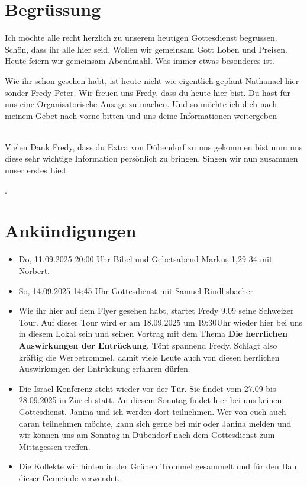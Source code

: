 \documentclass{../../inc/mybib}
\begin{document}
\section{Begrüssung}
Ich möchte alle recht herzlich zu unserem heutigen Gottesdienst begrüssen. Schön, dass ihr alle hier seid. Wollen wir gemeinsam Gott Loben und Preisen. Heute feiern wir gemeinsam Abendmahl. Was immer etwas besonderes ist. 
\begin{block}
Wie ihr schon gesehen habt, ist heute nicht wie eigentlich geplant Nathanael hier sonder Fredy Peter. Wir freuen uns Fredy, dass du heute hier bist. Du hast für uns eine Organisatorische Ansage zu machen. Und so möchte ich dich nach meinem Gebet nach vorne bitten und uns deine Informationen weitergeben
\end{block}

\beten{}
\\

Vielen Dank Fredy, dass du Extra von Dübendorf zu uns gekommen bist unm uns diese sehr wichtige Information persönlich zu bringen. Singen wir nun zusammen unser erstes Lied.

{}.

\section{Ankündigungen}
\begin{itemize}
    \item {} Do, 11.09.2025 20:00 Uhr Bibel und Gebetsabend Markus 1,29-34 mit Norbert.
    \item {} So, 14.09.2025 14:45 Uhr Gottesdienst mit Samuel Rindlisbacher
    \item {} Wie ihr hier auf dem Flyer gesehen habt, startet Fredy 9.09 seine Schweizer Tour. Auf dieser Tour wird er am 18.09.2025 um 19:30Uhr wieder hier bei uns in diesem Lokal sein und seinen Vortrag mit dem Thema \textbf{Die herrlichen Auswirkungen der Entrückung}. Tönt spannend Fredy. Schlagt also kräftig die Werbetrommel, damit viele Leute auch von diesen herrlichen Auswirkungen der Entrückung erfahren dürfen.
    \item {} Die Israel Konferenz steht wieder vor der Tür. Sie findet vom 27.09 bis 28.09.2025 in Zürich statt. An diesem Sonntag findet hier bei uns keinen Gottesdienst. Janina und ich werden dort teilnehmen. Wer von euch auch daran teilnehmen möchte, kann sich gerne bei mir oder Janina melden und wir können uns am Sonntag in Dübendorf nach dem Gottesdienst zum Mittagessen treffen.
    \item Die Kollekte wir hinten in der Grünen Trommel gesammelt und für den Bau dieser Gemeinde verwendet.
\end{itemize}
\end{document}
